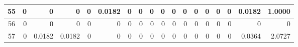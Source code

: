 \begin{table}[ht]
\begin{adjustbox}{width = \textwidth, center}
\begin{tabular}{|c|r|r|r|r|r|r|r|r|r|r|r|r|r|r|r|r|r|}
            \rowcolor[HTML]{FFFFFF} 
            \cellcolor[HTML]{CFE2F3}55                           & 0                                              & 0                                              & 0                                              & 0                                              & \cellcolor[HTML]{C7E9D8}0.0182                 & 0                                              & 0                                              & 0                                               & 0                                               & 0                                               & 0                                               & 0                                               & 0                                               & 0                                               & 0                                               & \cellcolor[HTML]{D9D2E9}0.0182                                                        & \cellcolor[HTML]{D9D2E9}1.0000                                                            \\ \hline
            \rowcolor[HTML]{FFFFFF} 
            \cellcolor[HTML]{CFE2F3}56                           & 0                                              & 0                                              & 0                                              & 0                                              & 0                                              & 0                                              & 0                                              & 0                                               & 0                                               & 0                                               & 0                                               & 0                                               & 0                                               & 0                                               & 0                                               & \cellcolor[HTML]{D9D2E9}0                                                             & \cellcolor[HTML]{D9D2E9}0                                                                 \\ \hline
            \rowcolor[HTML]{FFFFFF} 
            \cellcolor[HTML]{CFE2F3}57                           & 0                                              & \cellcolor[HTML]{C7E9D8}0.0182                 & \cellcolor[HTML]{C7E9D8}0.0182                 & 0                                              & 0                                              & 0                                              & 0                                              & 0                                               & 0                                               & 0                                               & 0                                               & 0                                               & 0                                               & 0                                               & 0                                               & \cellcolor[HTML]{D9D2E9}0.0364                                                        & \cellcolor[HTML]{D9D2E9}2.0727                                                            \\ \hline

\end{tabular}
\end{adjustbox}
\end{table}
